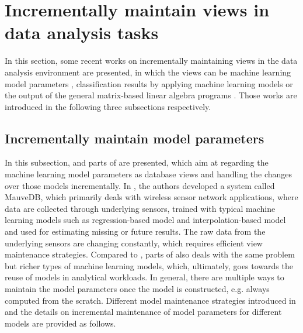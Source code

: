 \section{Incrementally maintain views in data analysis tasks}
In this section, some recent works on incrementally maintaining views in the data analysis environment are presented, in which the views can be machine learning model parameters \cite{deshpande2006mauvedb, gupta2015processing}, classification results by applying machine learning models \cite{koc2011incrementally} or the output of the general matrix-based linear algebra programs \cite{nikolic2014linview}. Those works are introduced in the following three subsections respectively. 


\subsection{Incrementally maintain model parameters}
In this subsection, \cite{deshpande2006mauvedb} and parts of \cite{gupta2015processing} are presented, which aim at regarding the machine learning model parameters as database views and handling the changes over those models incrementally. In \cite{deshpande2006mauvedb}, the authors developed a system called MauveDB, which primarily deals with wireless sensor network applications, where data are collected through underlying sensors, trained with typical machine learning models such as regression-based model and interpolation-based model and used for estimating missing or future results. 
The raw data from the underlying sensors are changing constantly, which requires efficient view maintenance strategies. 
Compared to \cite{deshpande2006mauvedb}, parts of \cite{gupta2015processing} also deals with the same problem but richer types of machine learning models, which, ultimately, goes towards the reuse of models in analytical workloads. In general, there are multiple ways to maintain the model parameters once the model is constructed, e.g. always computed from the scratch. Different model maintenance strategies introduced in \cite{deshpande2006mauvedb} and the details on incremental maintenance of model parameters for different models are provided as follows.




